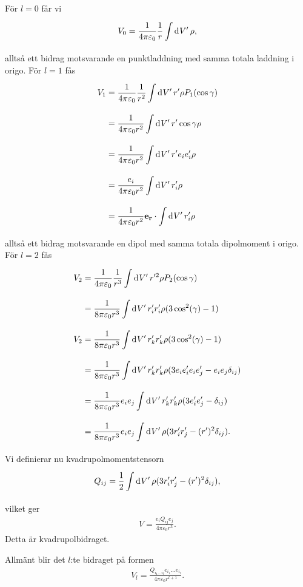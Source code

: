 För $l = 0$ får vi
\begin{align*}
	V_{0} = \frac{1}{4\pi\varepsilon_{0}}\frac{1}{r}\int\limits_{}^{}\dd[]{V'}\rho,
\end{align*}
alltså ett bidrag motsvarande en punktladdning med samma totala laddning i origo. För $l = 1$ fås
\begin{align*}
	V_{1} &= \frac{1}{4\pi\varepsilon_{0}}\frac{1}{r^{2}}\int\limits_{}^{}\dd[]{V'}r'\rho P_{1}(\cos{\gamma}) \\
	      &= \frac{1}{4\pi\varepsilon_{0}r^{2}}\int\limits_{}^{}\dd[]{V'}r'\cos{\gamma}\rho \\
	      &= \frac{1}{4\pi\varepsilon_{0}r^{2}}\int\limits_{}^{}\dd[]{V'}r'e_{i}e_{i}'\rho \\
	      &= \frac{e_{i}}{4\pi\varepsilon_{0}r^{2}}\int\limits_{}^{}\dd[]{V'}r_{i}'\rho \\
	      &= \frac{1}{4\pi\varepsilon_{0}r^{2}}\vb{e}_{\vb{r}}\cdot\int\limits_{}^{}\dd[]{V'}r_{i}'\rho
\end{align*}
alltså ett bidrag motsvarande en dipol med samma totala dipolmoment i origo. För $l = 2$ fås
\begin{align*}
	V_{2} &= \frac{1}{4\pi\varepsilon_{0}}\frac{1}{r^{3}}\int\limits_{}^{}\dd[]{V'}r'^{2}\rho P_{2}(\cos{\gamma}) \\
	      &= \frac{1}{8\pi\varepsilon_{0}r^{3}}\int\limits_{}^{}\dd[]{V'}r_{i}'r_{i}'\rho(3\cos[2](\gamma) - 1) \\
	V_{2} &= \frac{1}{8\pi\varepsilon_{0}r^{3}}\int\limits_{}^{}\dd[]{V'}r_{k}'r_{k}'\rho(3\cos[2](\gamma) - 1)  \\
	      &= \frac{1}{8\pi\varepsilon_{0}r^{3}}\int\limits_{}^{}\dd[]{V'}r_{k}'r_{k}'\rho(3e_{i}e_{i}'e_{i}e_{j}' - e_{i}e_{j}\delta_{ij}) \\
	      &= \frac{1}{8\pi\varepsilon_{0}r^{3}}e_{i}e_{j}\int\limits_{}^{}\dd[]{V'}r_{k}'r_{k}'\rho(3e_{i}'e_{j}' - \delta_{ij}) \\
	      &= \frac{1}{8\pi\varepsilon_{0}r^{3}}e_{i}e_{j}\int\limits_{}^{}\dd[]{V'}\rho(3r_{i}'r_{j}' - (r')^{2}\delta_{ij}).
\end{align*}
Vi definierar nu kvadrupolmomentstensorn
\begin{align*}
	Q_{ij} = \frac{1}{2}\int\limits_{}^{}\dd[]{V'}\rho(3r_{i}'r_{j}' - (r')^{2}\delta_{ij}),
\end{align*}
vilket ger
\begin{align*}
	V = \frac{e_{i}Q_{ij}e_{j}}{4\pi\varepsilon_{0}r^{3}}.
\end{align*}
Detta är kvadrupolbidraget.

Allmänt blir det $l$:te bidraget på formen
\begin{align*}
	V_{l} = \frac{Q_{i_{1}\dots i_{l}}e_{i_{1}}\dots e_{i_{l}}}{4\pi\varepsilon_{0}r^{l + 1}}.
\end{align*}

